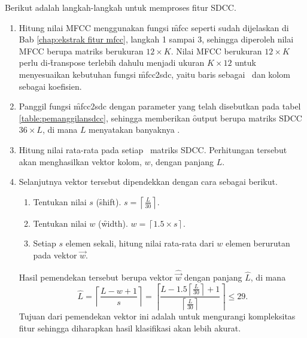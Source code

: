 Berikut adalah langkah-langkah untuk memproses fitur SDCC.
\begin{enumerate}
  \item Hitung nilai MFCC menggunakan fungsi \f{mfcc} seperti sudah dijelaskan di Bab \ref{chap:ekstrak fitur mfcc}, langkah 1 sampai 3, sehingga diperoleh nilai MFCC berupa matriks berukuran $12\times K$. Nilai MFCC berukuran $12\times K$ perlu di-\f{transpose} terlebih dahulu menjadi ukuran $K\times12$ untuk menyesuaikan kebutuhan fungsi \f{mfcc2sdc}, yaitu baris sebagai \fr~dan kolom sebagai koefisien.

	\item Panggil fungsi \f{mfcc2sdc} dengan parameter yang telah disebutkan pada tabel \ref{table:pemanggilansdcc}, sehingga memberikan \f{output} berupa matriks SDCC $36\times L$, di mana $L$ menyatakan banyaknya \fr.

	\item Hitung nilai rata-rata pada setiap \fr~matriks SDCC. Perhitungan tersebut akan menghasilkan vektor kolom, $w$, dengan panjang $L$.

	\item Selanjutnya vektor tersebut dipendekkan dengan cara sebagai berikut.
	\begin{enumerate}[label*=\arabic*.]
		\item Tentukan nilai $s$ (\f{shift}). $s = \left\lceil\frac{L}{30}\right\rceil$.
		\item Tentukan nilai $w$ (\f{width}). $w = \left\lceil1.5\times s\right\rceil$.
		\item Setiap $s$ elemen sekali, hitung nilai rata-rata dari $w$ elemen berurutan pada vektor $\vec{w}$.
	\end{enumerate}
	Hasil pemendekan tersebut berupa vektor $\widehat{\vec{w}}$ dengan panjang $\widehat L$, di mana \[ \widehat L = \left\lceil \frac{L-w+1}{s} \right\rceil = \left\lceil \frac{L-1.5\left\lceil\frac{L}{30}\right\rceil+1}{\left\lceil\frac{L}{30}\right\rceil} \right\rceil \leq 29. \] Tujuan dari pemendekan vektor ini adalah untuk mengurangi kompleksitas fitur sehingga diharapkan hasil klasifikasi akan lebih akurat.


\end{enumerate}
